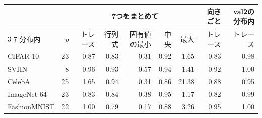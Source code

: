 \documentclass[border=3pt]{standalone}
\begin{document}
%
\begin{tabular}{lr*{5}{r}rr}%
\toprule
 & & \multicolumn{5}{c}{7つをまとめて} & 向きごと & val2の分布内\\
\cmidrule(lr){3-7}
分布内 & $p$ & トレース & 行列式 & 固有値の最小 & 中央 & 最大 & トレース & トレース\\
\midrule
CIFAR-10 & 23 & 0.87 & 0.83 & 0.31 & 0.92 & 1.65 & 0.83 & 0.98\\
SVHN & 8 & 0.96 & 0.93 & 0.57 & 0.94 & 1.41 & 0.92 & 1.00\\
CelebA & 25 & 1.65 & 0.94 & 0.31 & 0.86 & 21.38 & 0.88 & 0.95\\
ImageNet-64 & 23 & 0.83 & 0.84 & 0.38 & 0.95 & 1.17 & 0.82 & 0.99\\
FashionMNIST & 22 & 1.00 & 0.79 & 0.17 & 0.88 & 3.26 & 0.95 & 1.00\\
\bottomrule
\end{tabular}%
\end{document}
